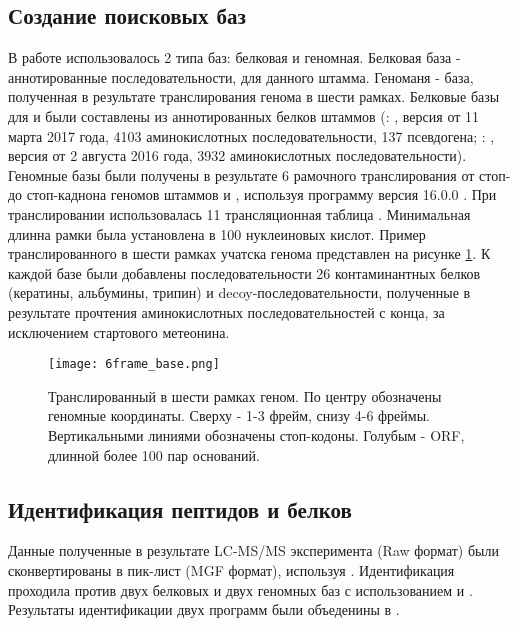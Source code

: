 \subsection{Создание поисковых баз}
В работе использовалось 2 типа баз: белковая и геномная. Белковая база - аннотированные последовательности, для данного штамма. Геноманя - база, полученная в результате транслирования генома в шести рамках.
Белковые базы для  и  были составлены из аннотированных белков штаммов (: , версия от 11 марта 2017 года, 4103 аминокислотных последовательности, 137 псевдогена; : , версия от 2 августа 2016 года, 3932 аминокислотных последовательности).
Геномные базы были получены в результате 6 рамочного транслирования от стоп- до стоп-каднона геномов штаммов  и , используя программу  версия 16.0.0 \cite{rutherford2000artemis}. При транслировании использовалась 11 трансляционная таблица . Минимальная длинна рамки была установлена в 100 нуклеиновых кислот. Пример транслированного в шести рамках учатска генома представлен на рисунке \ref{6frame_base}.
К каждой базе были добавлены последовательности 26 контаминантных белков (кератины, альбумины, трипин) и decoy-последовательности, полученные в результате прочтения аминокислотных последовательностей с конца, за исключением стартового метеонина. 

\begin{figure}[h!]
    \begin{center}
        \texttt{[image: 6frame\_base.png]}
    \end{center}
\caption[foo bar]{Транслированный в шести рамках геном. По центру обозначены геномные координаты. Сверху - 1-3 фрейм, снизу 4-6 фреймы. Вертикальными линиями обозначены стоп-кодоны. Голубым - ORF, длинной более 100 пар оснований.}
\label{6frame_base}
\end{figure}

\subsection{Идентификация пептидов и белков}
Данные полученные в результате LC-MS/MS эксперимента (Raw формат) были сконвертированы в пик-лист (MGF формат), используя  \cite{chambers2012cross}. Идентификация проходила против двух белковых и двух геномных баз с использованием  \cite{cottrell1999probability} и  \cite{fenyo2003method}. Результаты идентификации двух программ были объеденины в . 

